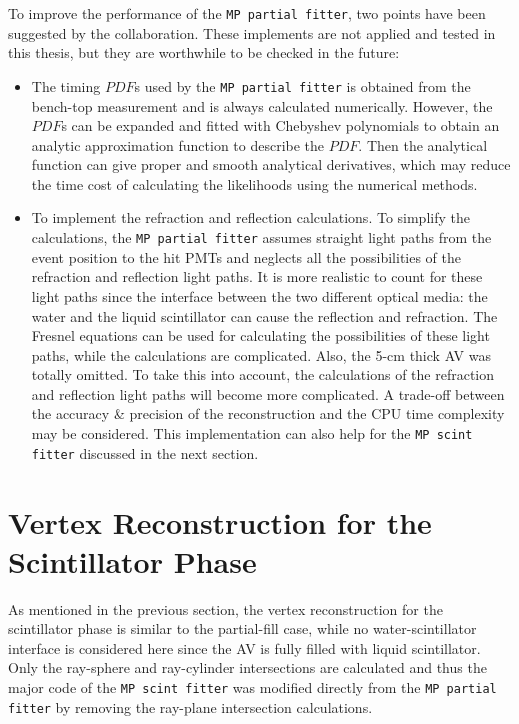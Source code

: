 To improve the performance of the \texttt{MP partial fitter}, two points have been suggested by the collaboration. These implements are not applied and tested in this thesis, but they are worthwhile to be checked in the future:
\begin{itemize}
	\item The timing $PDF$s used by the \texttt{MP partial fitter} is obtained from the bench-top measurement and is always calculated numerically. However, the $PDF$s can be expanded and fitted with Chebyshev polynomials to obtain an analytic approximation function to describe the $PDF$\cite{press2007numerical}. Then the analytical function can give proper and smooth analytical derivatives, which may reduce the time cost of calculating the likelihoods using the numerical methods.	
	\item To implement the refraction and reflection calculations. To simplify the calculations, the \texttt{MP partial fitter} assumes straight light paths from the event position to the hit PMTs and neglects all the possibilities of the refraction and reflection light paths. It is more realistic to count for these light paths since the interface between the two different optical media: the water and the liquid scintillator can cause the reflection and refraction. The Fresnel equations can be used for calculating the possibilities of these light paths\cite{partialWater}, while the calculations are complicated. Also, the 5-cm thick AV was totally omitted. To take this into account, the calculations of the refraction and reflection light paths will become more complicated. A trade-off between the accuracy \& precision of the reconstruction and the CPU time complexity may be considered. This implementation can also help for the \texttt{MP scint fitter} discussed in the next section.
\end{itemize}

\section{Vertex Reconstruction for the Scintillator Phase}\label{sect:scintFitter}
As mentioned in the previous section, the vertex reconstruction for the scintillator phase is similar to the partial-fill case, while no water-scintillator interface is considered here since the AV is fully filled with liquid scintillator. Only the ray-sphere and ray-cylinder intersections are calculated and thus the major code of the \texttt{MP scint fitter} was modified directly from the \texttt{MP partial fitter} by removing the ray-plane intersection calculations.


